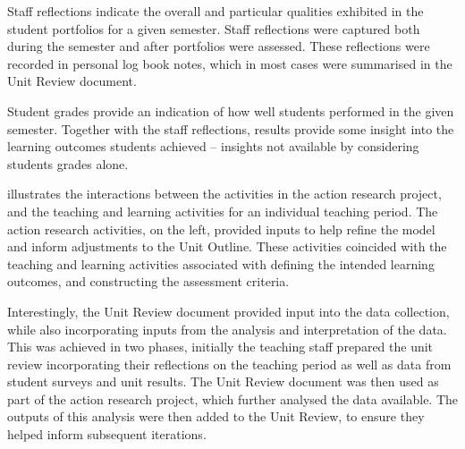 
Staff reflections indicate the overall and particular qualities exhibited in the student portfolios for a given semester. Staff reflections were captured both during the semester and after portfolios were assessed. These reflections were recorded in personal log book notes, which in most cases were summarised in the Unit Review document.

Student grades provide an indication of how well students performed in the given semester. Together with the staff reflections, results provide some insight into the learning outcomes students achieved -- insights not available by considering students grades alone.

 illustrates the interactions between the activities in the action research project, and the teaching and learning activities for an individual teaching period. The action research activities, on the left, provided inputs to help refine the model and inform adjustments to the Unit Outline. These activities coincided with the teaching and learning activities associated with defining the intended learning outcomes, and constructing the assessment criteria. 

Interestingly, the Unit Review document provided input into the data collection, while also incorporating inputs from the analysis and interpretation of the data. This was achieved in two phases, initially the teaching staff prepared the unit review incorporating their reflections on the teaching period as well as data from student surveys and unit results. The Unit Review document was then used as part of the action research project, which further analysed the data available. The outputs of this analysis were then added to the Unit Review, to ensure they helped inform subsequent iterations.

